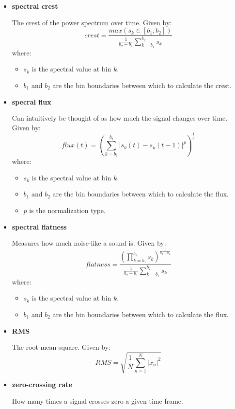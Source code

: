\documentclass[11pt]{article}
\begin{document}
\begin{itemize}
\item \textbf{ spectral crest }
\label{sec:org25d762a}

    The crest of the power spectrum over time. Given by:
        \[ crest = \frac{max(s_{k}\in[b_{1}, b_{2}])}{\frac{1}{b_{2} - b_{1}}\sum^{b_{2}}_{k=b_{1}}s_{k}} \]
    where:
    \begin{itemize}
      \item $s_{k}$ is the spectral value at bin $k$.
      \item $b_{1}$ and $b_{2}$ are the bin boundaries between which to calculate the crest.
    \end{itemize}
\item \textbf{ specral flux }
\label{sec:org8d3ce71}

    Can intuitively be thought of as how much the signal changes over time. Given by:
        \[ flux(t) = (\sum^{b_{2}}_{k=b_{1}}|s_{k}(t)-s_{k}(t-1)|^{p})^{\frac{1}{p}} \]
    where:
    \begin{itemize}
      \item $s_{k}$ is the spectral value at bin $k$.
      \item $b_{1}$ and $b_{2}$ are the bin boundaries between which to calculate the flux.
      \item $p$ is the normalization type.
    \end{itemize}

\item \textbf{spectral flatness}
\label{sec:org06c8a6d}

    Measures how much noise-like a sound is. Given by:
        \[ flatness = \frac{(\prod^{b_{2}}_{k=b_{1}}s_{k})^{\frac{1}{b_{2}-b_{1}}}}{\frac{1}{b_{2}-b_{1}}\sum^{b_{2}}_{k=b_{1}}s_{k}} \]
    where:
    \begin{itemize}
      \item $s_{k}$ is the spectral value at bin $k$.
      \item $b_{1}$ and $b_{2}$ are the bin boundaries between which to calculate the flux.
    \end{itemize}
\item \textbf{ RMS }
\label{sec:orgb1f5108}

    The root-mean-square. Given by:
    \[ RMS = \sqrt{\frac{1}{N}\sum^{N}_{n=1}|x_{n}|^{2}}\]

\item \textbf{ zero-crossing rate }
\label{sec:org7b27629}

    How many times a signal crosses zero a given time frame.
\end{itemize}
\end{document}
